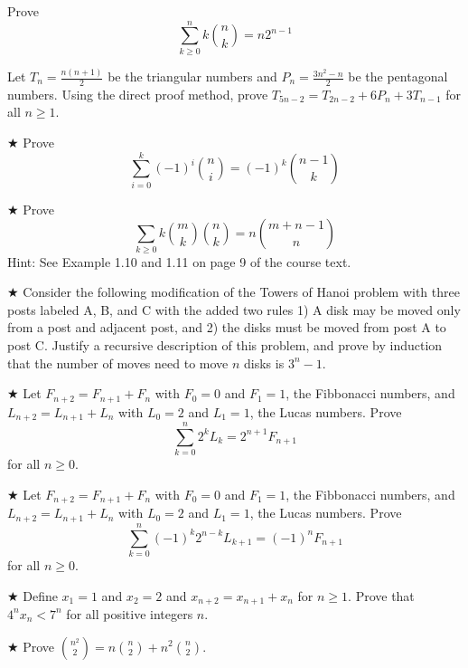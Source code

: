 
\begin{proofp}
Prove $$\sum_{k\ge0}^{n}k\binom{n}{k}=n2^{n-1}$$
\end{proofp}

\begin{proofp}
Let $T_n=\frac{n(n+1)}{2}$ be the triangular numbers and $P_n =\frac{3n^2-n}{2}$ be the pentagonal numbers. Using the direct proof method, prove $T_{5n-2}=T_{2n-2}+6P_n+3T_{n-1}$ for all $n\ge1$.
\end{proofp}

\begin{proofp}$\bigstar$
Prove $$\sum_{i=0}^{k}(-1)^i\binom{n}{i}=(-1)^k\binom{n-1}{k}$$
\end{proofp}

\begin{proofp}$\bigstar$
Prove  $$\sum_{k\ge0}^{}k\binom{m}{k}\binom{n}{k}=n\binom{m+n-1}{n}$$
Hint: See Example 1.10 and 1.11 on page 9 of the course text.
\end{proofp}

\begin{proofp}$\bigstar$
Consider the following modification of the Towers of Hanoi problem with three posts labeled A, B, and C with the added two rules 1) A disk may be moved only from a post and adjacent post, and 2) the disks must be moved from post A to post C.  Justify a recursive description of this problem, and prove by induction that the number of moves need to move $n$ disks is $3^n-1$.
\end{proofp}




\begin{proofp}$\bigstar$
Let $F_{n+2}=F_{n+1}+F_{n}$ with $F_0=0$ and $F_1=1$, the Fibbonacci numbers, and $L_{n+2}=L_{n+1}+L_{n}$ with $L_0=2$ and $L_1=1$, the Lucas numbers.  Prove
$$\sum_{k=0}^{n}2^{k}L_{k}=2^{n+1}F_{n+1}$$
for all $n\ge 0$.
\end{proofp}

\begin{proofp}$\bigstar$
Let $F_{n+2}=F_{n+1}+F_{n}$ with $F_0=0$ and $F_1=1$, the Fibbonacci numbers, and $L_{n+2}=L_{n+1}+L_{n}$ with $L_0=2$ and $L_1=1$, the Lucas numbers.  Prove
$$\sum_{k=0}^{n}(-1)^k2^{n-k}L_{k+1}=(-1)^nF_{n+1}$$
for all $n\ge 0$.
\end{proofp}

\begin{proofp}$\bigstar$
Define $x_1=1$ and $x_2=2$ and $x_{n+2}=x_{n+1}+x_{n}$ for $n\ge 1$. Prove that $4^nx_n<7^n$ for all positive integers $n$.
\end{proofp}

\begin{proofp}$\bigstar$
Prove $\binom{n^2}{2}=n\binom{n}{2}+n^2\binom{n}{2}$.
\end{proofp}


